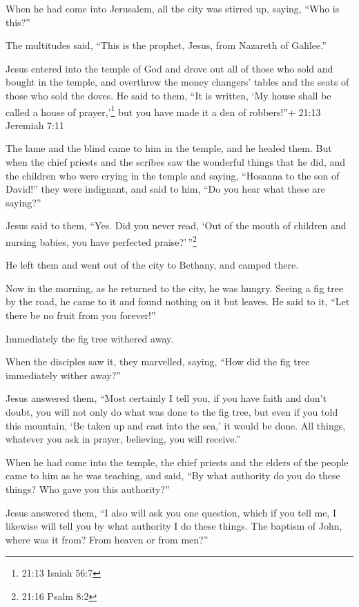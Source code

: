  When he had come into Jerusalem, all the city was stirred
up, saying, ``Who is this?''

 The multitudes said, ``This is the prophet, Jesus, from
Nazareth of Galilee.''

 Jesus entered into the temple of God and drove out all of
those who sold and bought in the temple, and overthrew the money
changers' tables and the seats of those who sold the doves.
 He said to them, ``It is written, `My house shall be
called a house of prayer,'\footnote{21:13 Isaiah 56:7} but you have made
it a den of robbers!''+ 21:13 Jeremiah 7:11

 The lame and the blind came to him in the temple, and he
healed them.  But when the chief priests and the scribes
saw the wonderful things that he did, and the children who were crying
in the temple and saying, ``Hosanna to the son of David!'' they were
indignant,  and said to him, ``Do you hear what these are
saying?''

Jesus said to them, ``Yes. Did you never read, `Out of the mouth of
children and nursing babies, you have perfected praise?'\,''\footnote{21:16
  Psalm 8:2}

 He left them and went out of the city to Bethany, and
camped there.

 Now in the morning, as he returned to the city, he was
hungry.  Seeing a fig tree by the road, he came to it and
found nothing on it but leaves. He said to it, ``Let there be no fruit
from you forever!''

Immediately the fig tree withered away.

 When the disciples saw it, they marvelled, saying, ``How
did the fig tree immediately wither away?''

 Jesus answered them, ``Most certainly I tell you, if you
have faith and don't doubt, you will not only do what was done to the
fig tree, but even if you told this mountain, `Be taken up and cast into
the sea,' it would be done.  All things, whatever you ask
in prayer, believing, you will receive.''

 When he had come into the temple, the chief priests and
the elders of the people came to him as he was teaching, and said, ``By
what authority do you do these things? Who gave you this authority?''

 Jesus answered them, ``I also will ask you one question,
which if you tell me, I likewise will tell you by what authority I do
these things.  The baptism of John, where was it from? From
heaven or from men?''

